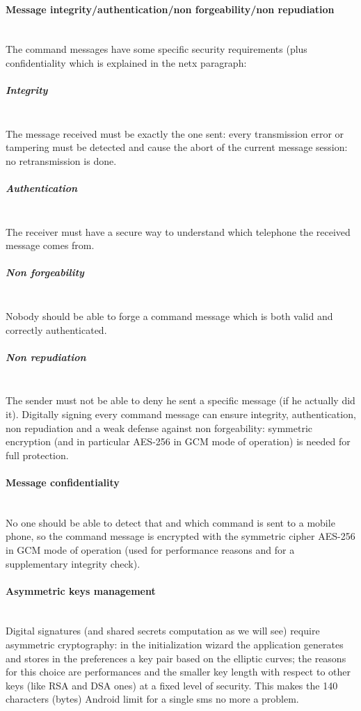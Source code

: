 \documentclass[a4paper,12pt]{article}
\begin{document}
\paragraph{Message integrity/authentication/non forgeability/non repudiation} \hspace{0pt} \\
\small{The command messages have some specific security requirements (plus confidentiality which is explained in the netx paragraph:}
\subparagraph{\textit{Integrity}} \hspace{0pt} \\
\small{The message received must be exactly the one sent: every transmission error or tampering must be detected and cause the abort of the current message session: no retransmission is done.}
\subparagraph{\textit{Authentication}} \hspace{0pt} \\
\small{The receiver must have a secure way to understand which telephone the received message comes from.}
\subparagraph{\textit{Non forgeability}} \hspace{0pt} \\
\small{Nobody should be able to forge a command message which is both valid and correctly authenticated.}
\subparagraph{\textit{Non repudiation}} \hspace{0pt} \\
\small{The sender must not be able to deny he sent a specific message (if he actually did it).}
\vspace{25pt}
\newline
\small{Digitally signing every command message can ensure integrity, authentication, non repudiation and a weak defense against non forgeability: symmetric encryption (and in particular AES-256 in GCM mode of operation) is needed for full protection.}
\paragraph{Message confidentiality} \hspace{0pt} \\
\small{No one should be able to detect that and which command is sent to a mobile phone, so the command message is encrypted with the symmetric cipher AES-256 in GCM mode of operation (used for performance reasons and for a supplementary integrity check).}
\paragraph{Asymmetric keys management} \hspace{0pt} \\
\small{Digital signatures (and shared secrets computation as we will see) require asymmetric cryptography: in the initialization wizard the application generates and stores in the preferences a key pair based on the elliptic curves; the reasons for this choice are performances and the smaller key length with respect to other keys (like RSA and DSA ones) at a fixed level of security. This makes the 140 characters (bytes) Android limit for a single sms no more a problem.}
\end{document}
